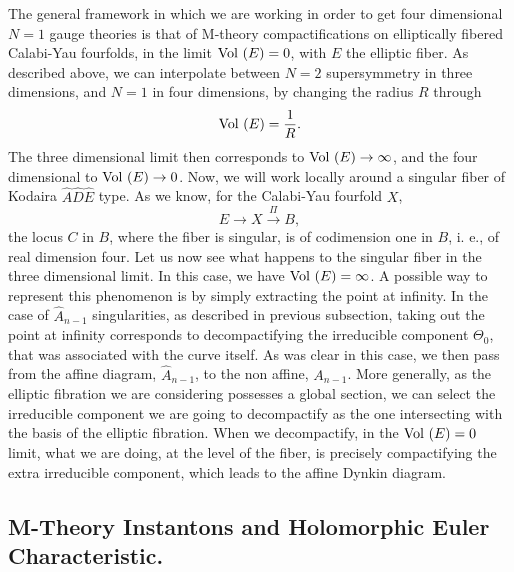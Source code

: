The general framework in which we are working in order to get four dimensional 
$N=1$ gauge theories is that of M-theory compactifications on elliptically 
fibered Calabi-Yau fourfolds, in the limit $\hbox {Vol }(E)=0$, with $E$ the elliptic fiber. 
As described above, we can interpolate between $N=2$ supersymmetry in three 
dimensions, and $N=1$ in four dimensions, by changing the radius $R$ 
through 
\begin{equation}
\hbox {Vol }(E) = \frac {1}{R}.
\label{eq:r44}
\end{equation}
The three dimensional limit then corresponds to $\hbox {Vol }(E) \rightarrow 
\infty$, and the four dimensional to $\hbox {Vol } (E) \rightarrow 0$. Now, 
we will work locally around a singular fiber of Kodaira $\hat{A}\hat{D}
\hat{E}$ type. As we know, for the Calabi-Yau fourfold $X$,
\begin{equation}
E \rightarrow X \stackrel{\Pi}{\rightarrow} B,
\label{eq:r45}
\end{equation}
the locus $C$ in $B$, where the fiber is singular, is of codimension one 
in $B$, i. e., of real dimension four. Let us now see what happens to the 
singular fiber in the three dimensional limit. In this case, we have 
$\hbox {Vol }(E)=\infty$. A possible way to represent this phenomenon is 
by simply extracting the point at infinity. In the case of $\hat{A}_{n-1}$ 
singularities, as described in previous subsection, taking out the point at infinity 
corresponds to decompactifying the irreducible component $\Theta_0$, that 
was associated with the curve itself. As was clear in this case, we then pass 
from the affine diagram, $\hat{A}_{n-1}$, to the non affine, $A_{n-1}$. More 
generally, as the elliptic fibration we are considering possesses a global section, 
we can select the irreducible component we are going to decompactify as the one 
intersecting with the basis of the elliptic fibration. When we decompactify, 
in the $\hbox {Vol }(E)=0$ limit, what we are doing, at the level of the 
fiber, is precisely compactifying the extra irreducible component, 
which leads to the affine Dynkin diagram.

\subsection{M-Theory Instantons and Holomorphic Euler Characteristic.}

